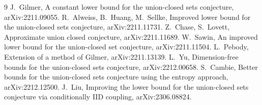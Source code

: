 \documentclass[11pt]{article}
\theoremstyle{definition}
\begin{document}
\begin{thebibliography}{9}
 J.~Gilmer, A constant lower bound for the union-closed sets conjecture, arXiv:2211.09055.
 R.~Alweiss, B.~Huang, M.~Sellke, Improved lower bound for the union-closed sets conjecture, arXiv:2211.11731.
 Z.~Chase, S.~Lovett, Approximate union closed conjecture, arXiv:2211.11689.
 W.~Sawin, An improved lower bound for the union-closed set conjecture, arXiv:2211.11504.
 L.~Pebody, Extension of a method of Gilmer, arXiv:2211.13139.
 L.~Yu, Dimension-free bounds for the union-closed sets conjecture, arXiv:2212.00658.
 S.~Cambie, Better bounds for the union-closed sets conjecture using the entropy approach, arXiv:2212.12500.
 J.~Liu, Improving the lower bound for the union-closed sets conjecture via conditionally IID coupling, arXiv:2306.08824.
\end{thebibliography}
\end{document}
